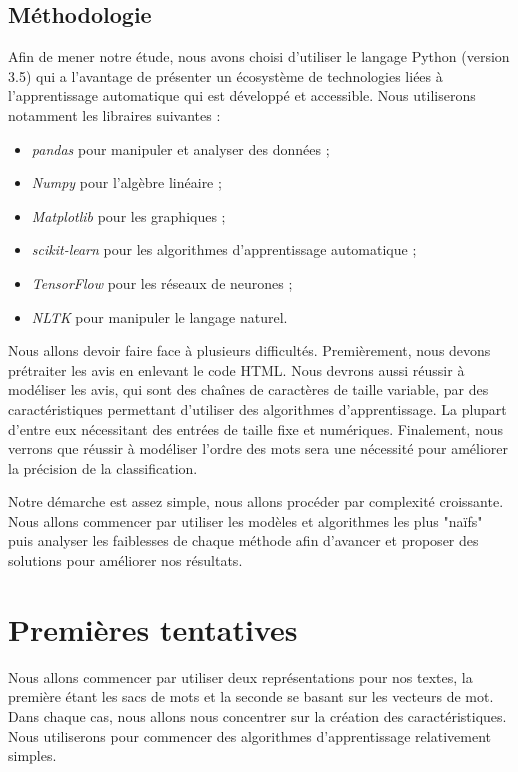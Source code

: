 \documentclass{article}
\begin{document}
\subsection{Méthodologie}

Afin de mener notre étude, nous avons choisi d'utiliser le langage Python (version 3.5) qui a l'avantage de présenter un écosystème de technologies liées à l'apprentissage automatique qui est développé et accessible. Nous utiliserons notamment les libraires suivantes :
\begin{itemize}
	\item \textit{pandas} pour manipuler et analyser des données ;
	\item \textit{Numpy} pour l'algèbre linéaire ; 
	\item \textit{Matplotlib} pour les graphiques ;
	\item \textit{scikit-learn} pour les algorithmes d'apprentissage automatique ;
	\item \textit{TensorFlow} pour les réseaux de neurones ;
	\item \textit{NLTK} pour manipuler le langage naturel.
\end{itemize}

Nous allons devoir faire face à plusieurs difficultés. Premièrement, nous devons prétraiter les avis en enlevant le code HTML. Nous devrons aussi réussir à modéliser les avis, qui sont des chaînes de caractères de taille variable, par des caractéristiques permettant d'utiliser des algorithmes d'apprentissage. La plupart d'entre eux nécessitant des entrées de taille fixe et numériques. Finalement, nous verrons que réussir à modéliser l'ordre des mots sera une nécessité pour améliorer la précision de la classification.

Notre démarche est assez simple, nous allons procéder par complexité croissante. Nous allons commencer par utiliser les modèles et algorithmes les plus "naïfs" puis analyser les faiblesses de chaque  méthode afin d'avancer et proposer des solutions pour améliorer nos résultats.

\section{Premières tentatives}

Nous allons commencer par utiliser deux représentations pour nos textes, la première étant les sacs de mots et la seconde se basant sur les vecteurs de mot. Dans chaque cas, nous allons nous concentrer sur la création des caractéristiques. Nous utiliserons pour commencer des algorithmes d'apprentissage relativement simples.
\end{document}
